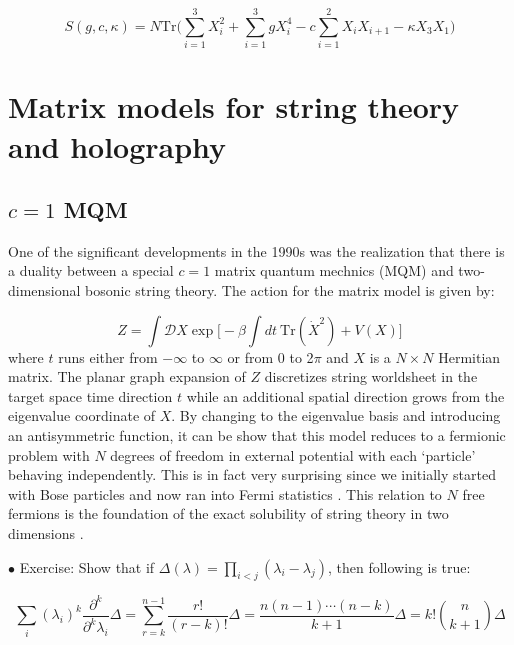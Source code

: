 \documentclass[11pt]{article}
\begin{document}
\begin{equation}
	\label{eq:Mehta2} 
	S(g,c,\kappa) = N \mbox{Tr} \Bigg(\sum_{i=1}^{3} X_{i}^2  + \sum_{i=1}^{3} g X_{i}^{4} - c \sum_{i=1}^{2} X_{i}X_{i+1} 
	- \kappa X_{3}X_{1} \Bigg)
\end{equation}

\section{Matrix models for string theory and holography} 

\subsection{$c=1$ MQM}
One of the significant developments in the 1990s was the realization that there is a duality between a special $c=1$ matrix quantum mechnics (MQM) and two-dimensional bosonic string theory. The action for the matrix model is given by:

\begin{equation}
	Z = \int \mathcal{D} X \exp \Bigg[-\beta \int dt~\mbox{Tr} (\dot{X}^2) + V(X) \Bigg]
\end{equation}
where $t$ runs either from $-\infty$ to $\infty$ or from 0 to 2$\pi$ and $X$ is a 
$ N \times N$ Hermitian matrix. The planar graph expansion of $Z$ discretizes string worldsheet in the target space time direction $t$ while an additional spatial direction  
grows from the eigenvalue coordinate of $X$. By changing to the eigenvalue basis and introducing an antisymmetric function, it can be show that this model reduces to a fermionic problem with $N$ degrees of freedom in external potential with each `particle' behaving independently. This is in fact very surprising since we initially started with Bose particles and now ran into Fermi statistics \cite{Brezin:1977sv,Kazakov:1988ch}. 
This relation to $N$ free fermions is the foundation of the exact solubility of string theory in two dimensions \cite{Klebanov:1991qa}. 

\vspace{10mm}

\begin{mdframed}[backgroundcolor=blue!3] 
	\textsc{} 
	$\bullet$ Exercise: Show that if $\Delta(\lambda) =\prod_{i<j} (\lambda_i - \lambda_j)$, then following is true: 
	
	\[ \sum_{i} (\lambda_i)^{k} \frac{\partial^{k}}{\partial^{k} \lambda_i} \Delta =
	 \sum_{r=k}^{n-1}\frac{r!}{(r-k)!} \Delta = \frac{n (n-1) \cdots (n-k)}{k+1}
	 \Delta = k! {{n}\choose{k+1}} \Delta
	 \]
\end{mdframed} 
\end{document}
